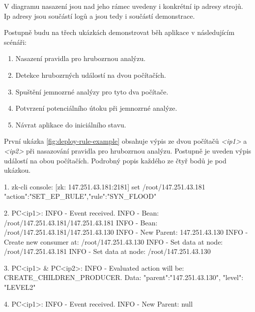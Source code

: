 \documentclass[
  digital, %
  table,   %
  nolof,     %
  nolot,     %
  oneside, %
  nocover,
  monochrome,
  12pt
]{fithesis3}
\begin{document}
V diagramu nasazení jsou nad jeho rámec uvedeny i konkrétní ip adresy strojů. Ip adresy jsou součástí logů a jsou tedy i součástí demonstrace.

Postupně budu na třech ukázkách demonstrovat běh aplikace v následujícím scénáři:

\begin{enumerate}
  \item Nasazení pravidla pro hrubozrnou analýzu.
  \item Detekce hrubozrných událostí na dvou počítačích.
  \item Spuštění jemnozrné analýzy pro tyto dva počítače.
  \item Potvrzení potenciálního útoku při jemnozrné analýze.
  \item Návrat aplikace do iniciálního stavu.
\end{enumerate}

První ukázka \ref{fig:deploy-rule-example} obsahuje výpis ze dvou počítačů \textit{<ip1>} a \textit{<ip2>} při nasazování pravidla pro hrubozrnou analýzu. Postupně je uveden výpis událostí na obou počítačích. Podrobný popis každého ze čtyř bodů je pod ukázkou.

\begin{center}
\begin{minipage}[H]{\linewidth}
	\begin{mylisting}
1. zk-cli console:
[zk: 147.251.43.181:2181] set /root/147.251.43.181
{"action":"SET_EP_RULE","rule":"SYN_FLOOD"}

2. PC<ip1>:
INFO - Event received.
INFO - Bean: /root/147.251.43.181/147.251.43.181
INFO - Bean: /root/147.251.43.181/147.251.43.130
INFO - New Parent: 147.251.43.130
INFO - Create new consumer at: /root/147.251.43.130
INFO - Set data at node: /root/147.251.43.181
INFO - Set data at node: /root/147.251.43.130

3. PC<ip1> & PC<ip2>:
INFO - Evaluated action will be: CREATE_CHILDREN_PRODUCER.
	Data: {"parent":"147.251.43.130", "level": "LEVEL2"}

4. PC<ip1>:
INFO - Event received.
INFO - New Parent: null
	\end{mylisting}
	\label{fig:deploy-rule-example}
\end{minipage}
\end{center}
\end{document}
